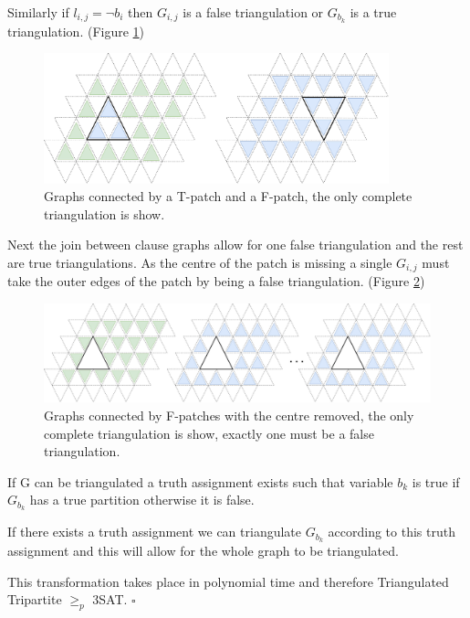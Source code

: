 \documentclass[a4paper,11pt]{report}
\begin{document}
Similarly if  $l_{i,j}=\neg b_i$ then $G_{i,j}$ is a false triangulation or $G_{b_k}$ is a true triangulation. (Figure \ref{holyertwo})

\begin{figure}[h!]
\begin{center}
		\includegraphics[width=100mm]{figures/lemma_two_holyer.png}
\end{center}
		\caption{Graphs connected by a T-patch and a F-patch, the only complete triangulation is show.}
\label{holyertwo}
\end{figure}

Next the join between clause graphs allow for one false triangulation and the rest  are true triangulations. As the centre of the patch is missing a single $G_{i,j}$ must take the outer edges of the patch by being a false triangulation. (Figure \ref{holyerthree})

\begin{figure}[h!]
\begin{center}
		\includegraphics[width=120mm]{figures/lemma_three_holyer.png}
\end{center}
		\caption{Graphs connected by F-patches with the centre removed, the only complete triangulation is show, exactly one must be a false triangulation.}
\label{holyerthree}
\end{figure}

If G can be triangulated a truth assignment exists such that variable $b_k$ is true if $G_{b_k}$ has a true partition otherwise it is false.

If there exists a truth assignment we can triangulate $G_{b_k}$ according to this truth assignment and this will allow for the whole graph to be triangulated.

This transformation takes place in polynomial time and therefore Triangulated Tripartite $\geq_p$ 3SAT. $\square$
\end{document}

